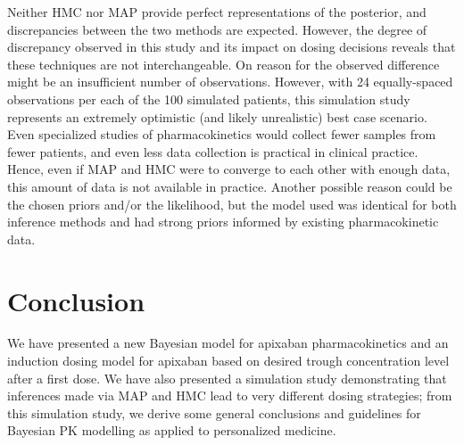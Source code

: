 Neither HMC nor MAP provide perfect representations of the posterior, and discrepancies between the two methods are expected. However, the degree of discrepancy observed in this study and its impact on dosing decisions reveals that these techniques are not interchangeable. On reason for the observed difference might be an insufficient number of observations.  However, with 24 equally-spaced observations per each of the 100 simulated patients, this simulation study represents an extremely optimistic (and likely unrealistic) best case scenario. Even specialized studies of pharmacokinetics would collect fewer samples from fewer patients, and even less data collection is practical in clinical practice. Hence, even if MAP and HMC were to converge to each other with enough data, this amount of data is not available in practice. Another possible reason could be the chosen priors and/or the likelihood, but the model used was identical for both inference methods and had strong priors informed by existing pharmacokinetic data.


\section{Conclusion}
We have presented a new Bayesian model for apixaban pharmacokinetics and an induction dosing model for apixaban based on desired trough concentration level after a first dose. We have also presented a simulation study demonstrating that inferences made via MAP and HMC lead to very different dosing strategies; from this simulation study, we derive some general conclusions and guidelines for Bayesian PK modelling as applied to personalized medicine.

